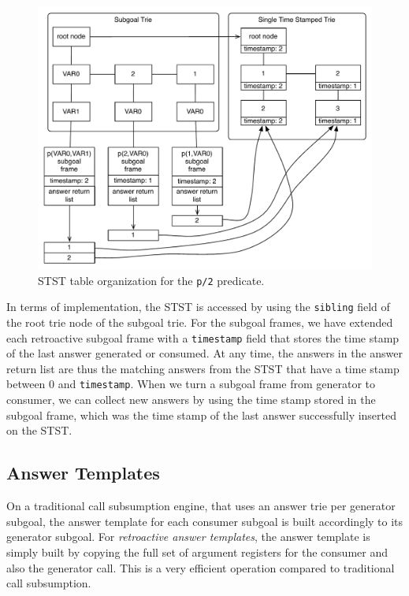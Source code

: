 \begin{figure}[ht]
  \centering
    \includegraphics[scale=0.6]{stst.pdf}
  \caption{STST table organization for the \texttt{p/2} predicate.}
  \label{fig:stst}
\end{figure}

In terms of implementation, the STST is accessed by using the \texttt{sibling} field of the root
trie node of the subgoal trie.
For the subgoal frames, we have extended each retroactive subgoal
frame with a \texttt{timestamp} field that stores the time stamp of the last answer
generated or consumed.
At any time, the answers in the answer return list are thus the matching 
answers from the STST that have a time stamp between 0 and \texttt{timestamp}.
When we turn a subgoal frame from generator to consumer,
we can collect new answers by using the time stamp stored in the subgoal frame, which was the
time stamp of the last answer successfully inserted on the STST.

\subsection{Answer Templates}

On a traditional call subsumption engine, that uses an answer trie per generator subgoal,
the answer template for each consumer subgoal is built accordingly to its generator subgoal.
For \textit{retroactive answer templates}, the answer template is simply built by copying
the full set of argument registers for the consumer and also the generator call. This is a very efficient operation
compared to traditional call subsumption.


